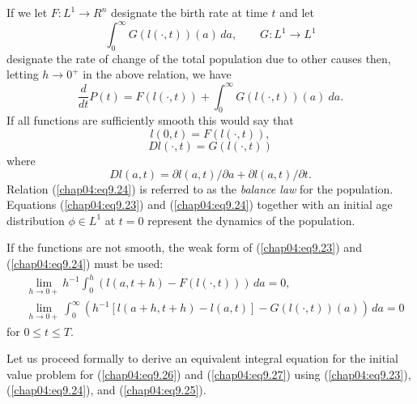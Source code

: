 \documentclass{surv-l}
\theoremstyle{plain}
\theoremstyle{definition}
\numberwithin{equation}{section}
\numberwithin{figure}{chapter}
\begin{document}
If we let $F: L^{1}\rightarrow R^{n}$ designate the birth rate at time $t$ and let
\begin{equation*}
\int_{0}^{\infty}G(l(\cdot, t))(a)\, da,\qquad G: L^{1}\rightarrow L^{1}
\end{equation*}
designate the rate of change of the total population due to other causes then, letting $h\rightarrow 0^{+}$ in the above relation, we have
\begin{equation}\label{chap04:eq9.22}
\frac{d}{dt}P(t)=F(l(\cdot, t))+\int_{0}^{\infty}G(l(\cdot, t))(a)\ da.
\end{equation}
If all functions are sufficiently smooth this would say that
\begin{equation}\label{chap04:eq9.23}
l(0, t)=F(l(\cdot, t)),
\end{equation}
\begin{equation}\label{chap04:eq9.24}
Dl(\cdot, t)=G(l(\cdot, t))
\end{equation}
where
\begin{equation}\label{chap04:eq9.25}
Dl(a, t)=\partial l(a, t)/\partial a+\partial l(a, t)/\partial t.
\end{equation}
Relation (\ref{chap04:eq9.24}) is referred to as the \emph{balance law} for the population. Equations (\ref{chap04:eq9.23}) and (\ref{chap04:eq9.24}) together with an initial age distribution $\phi \in L^{1}$ at $t=0$ represent the dynamics of the population.

If the functions are not smooth, the weak form of (\ref{chap04:eq9.23}) and (\ref{chap04:eq9.24}) must be used:
\begin{align}\label{chap04:eq9.26}
&\lim_{h\rightarrow 0+}h^{-1}\int_{0}^{h}(l(a, t+h)-F(l(\cdot, t)))\, da=0,\\
&\lim_{h\rightarrow 0+}\int_{0}^{\infty}(h^{-1}[l(a+h, t+h)-l(a, t)]-G(l(\cdot, t))(a))\, da=0\label{chap04:eq9.27}
\end{align}
for $0\leq t\leq T$.

Let us proceed formally to derive an equivalent integral equation for the initial value problem for (\ref{chap04:eq9.26}) and (\ref{chap04:eq9.27}) using (\ref{chap04:eq9.23}), (\ref{chap04:eq9.24}), and (\ref{chap04:eq9.25}).
\end{document}
